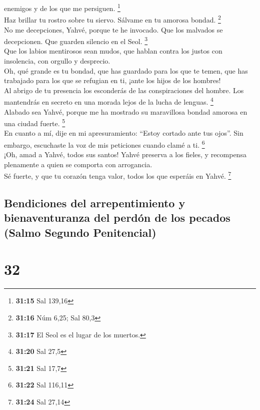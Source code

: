 enemigos y de los que me persiguen. \footnote{\textbf{31:15} Sal 139,16}\\
 Haz brillar tu rostro sobre tu siervo. Sálvame en tu
amorosa bondad. \footnote{\textbf{31:16} Núm 6,25; Sal 80,3}\\
 No me decepciones, Yahvé, porque te he invocado. Que los
malvados se decepcionen. Que guarden silencio en el Seol. \footnote{\textbf{31:17}
  El Seol es el lugar de los muertos.}\\
 Que los labios mentirosos sean mudos, que hablan contra
los justos con insolencia, con orgullo y desprecio.\\
 Oh, qué grande es tu bondad, que has guardado para los
que te temen, que has trabajado para los que se refugian en ti, ¡ante
los hijos de los hombres!\\
 Al abrigo de tu presencia los esconderás de las
conspiraciones del hombre. Los mantendrás en secreto en una morada lejos
de la lucha de lenguas. \footnote{\textbf{31:20} Sal 27,5}\\
 Alabado sea Yahvé, porque me ha mostrado su maravillosa
bondad amorosa en una ciudad fuerte. \footnote{\textbf{31:21} Sal 17,7}\\
 En cuanto a mí, dije en mi apresuramiento: ``Estoy
cortado ante tus ojos''. Sin embargo, escuchaste la voz de mis
peticiones cuando clamé a ti. \footnote{\textbf{31:22} Sal 116,11}\\
 ¡Oh, amad a Yahvé, todos sus santos! Yahvé preserva a
los fieles, y recompensa plenamente a quien se comporta con
arrogancia.\\
 Sé fuerte, y que tu corazón tenga valor, todos los que
esperáis en Yahvé. \footnote{\textbf{31:24} Sal 27,14}

\hypertarget{bendiciones-del-arrepentimiento-y-bienaventuranza-del-perduxf3n-de-los-pecados-salmo-segundo-penitencial}{%
\subsection{Bendiciones del arrepentimiento y bienaventuranza del perdón
de los pecados (Salmo Segundo
Penitencial)}\label{bendiciones-del-arrepentimiento-y-bienaventuranza-del-perduxf3n-de-los-pecados-salmo-segundo-penitencial}}

\hypertarget{section-31}{%
\section{32}\label{section-31}}

